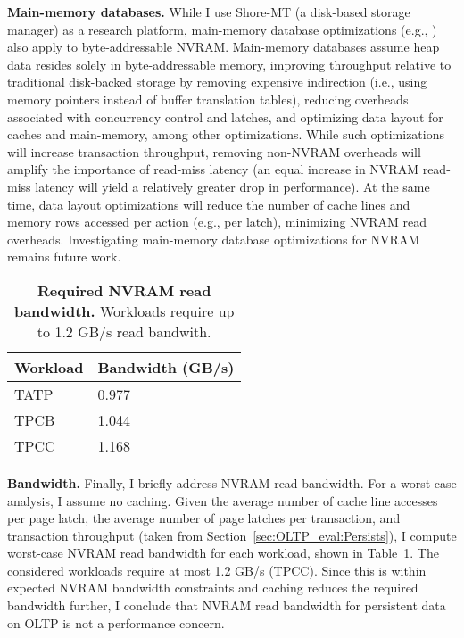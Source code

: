 \textbf{Main-memory databases.}
While I use Shore-MT (a disk-based storage manager) as a research platform, main-memory database optimizations (e.g., \cite{DiaconuFreedman13, BallardBehman11, Oracle09}) also apply to byte-addressable NVRAM.
Main-memory databas\-es assume heap data resides solely in byte-addressable memory, improving throughput relative to traditional disk-back\-ed storage by removing expensive indirection (i.e., using memory pointers instead of buffer translation tables), reducing overheads associated with concurrency control and latches, and optimizing data layout for caches and main-memory, among other optimizations.
While such optimizations will increase transaction throughput, removing non-NVRAM overheads will amplify the importance of read-miss latency (an equal increase in NVRAM read-miss latency will yield a relatively greater drop in performance).
At the same time, data layout optimizations will reduce the number of cache lines and memory rows accessed per action (e.g., per latch), minimizing NVRAM read overheads.
Investigating main-memory database optimizations for NVRAM remains future work.

\begin{table}
  \centering
  \begin{tabular}{l l}
    \hline
    Workload & Bandwidth (GB/s) \\
    \hline \hline
    TATP & 0.977 \\
    TPCB & 1.044 \\
    TPCC & 1.168 \\
    \hline
  \end{tabular}
  \caption{\textbf{Required NVRAM read bandwidth.} Workloads require up to 1.2 GB/s read bandwith.}
  \label{table::ReadBandwidth}
\end{table}

\textbf{Bandwidth.}
Finally, I briefly address NVRAM read bandwidth.
For a worst-case analysis, I assume no caching.
Given the average number of cache line accesses per page latch, the average number of page latches per transaction, and transaction throughput (taken from Section~\ref{sec:OLTP_eval:Persists}), I compute worst-case NVRAM read bandwidth for each workload, shown in Table~\ref{table::ReadBandwidth}.
The considered workloads require at most 1.2 GB/s (TPCC).
Since this is within expected NVRAM bandwidth constraints and caching reduces the required bandwidth further, I conclude that NVRAM read bandwidth for persistent data on OLTP is not a performance concern.


